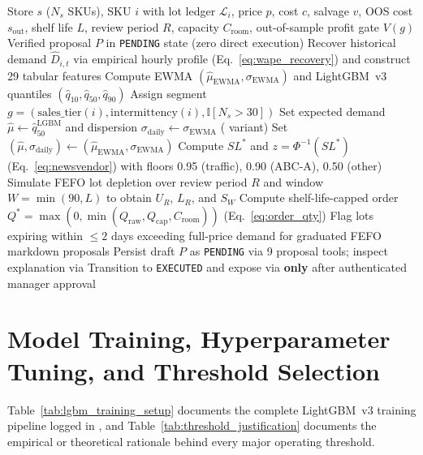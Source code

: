 \begin{algorithm}[htbp]
\caption{Profit-Gated Perishable Newsvendor (\texttt{B-Gate}), FEFO Caps \& HITL (\texttt{ops\_chest})}
\label{alg:ops_chest_newsvendor}
\footnotesize
\begin{algorithmic}[1]
\Require Store $s$ ($N_s$ SKUs), SKU $i$ with lot ledger $\mathcal{L}_i$, price $p$, cost $c$, salvage $v$, OOS cost $s_{\text{out}}$, shelf life $L$, review period $R$, capacity $C_{\text{room}}$, out-of-sample profit gate $V(g)$
\Ensure Verified proposal $P$ in \texttt{PENDING} state (zero direct execution)
\State Recover historical demand $\hat{D}_{i,t}$ via empirical hourly profile (Eq.~\ref{eq:wape_recovery}) and construct 29 tabular features
\State Compute EWMA $(\hat{\mu}_{\text{EWMA}}, \sigma_{\text{EWMA}})$ and LightGBM~v3 quantiles $(\hat{q}_{10}, \hat{q}_{50}, \hat{q}_{90})$
\State Assign segment $g = (\text{sales\_tier}(i), \text{intermittency}(i), \mathbb{I}[N_s > 30])$
    \State Set expected demand $\hat{\mu} \gets \hat{q}_{50}^{\text{LGBM}}$ and dispersion $\sigma_{\text{daily}} \gets \sigma_{\text{EWMA}}$ ( variant)
\Else
    \State Set $(\hat{\mu}, \sigma_{\text{daily}}) \gets (\hat{\mu}_{\text{EWMA}}, \sigma_{\text{EWMA}})$
\EndIf
\State Compute $SL^*$ and $z = \Phi^{-1}(SL^*)$ (Eq.~\ref{eq:newsvendor}) with floors 0.95 (traffic), 0.90 (ABC-A), 0.50 (other)
\State Simulate FEFO lot depletion over review period $R$ and window $W = \min(90, L)$ to obtain $U_R$, $L_R$, and $S_W$
\State Compute shelf-life-capped order $Q^* = \max(0, \min(Q_{\text{raw}}, Q_{\text{cap}}, C_{\text{room}}))$ (Eq.~\ref{eq:order_qty})
\State Flag lots expiring within $\le 2$ days exceeding full-price demand for graduated FEFO markdown proposals
\State Persist draft $P$ as \texttt{PENDING} via 9 proposal tools; inspect explanation via 
\State Transition to \texttt{EXECUTED} and expose via  \textbf{only} after authenticated manager approval
\end{algorithmic}
\end{algorithm}

\section{Model Training, Hyperparameter Tuning, and Threshold Selection}

Table~\ref{tab:lgbm_training_setup} documents the complete LightGBM~v3 training pipeline logged in , and Table~\ref{tab:threshold_justification} documents the empirical or theoretical rationale behind every major operating threshold.

